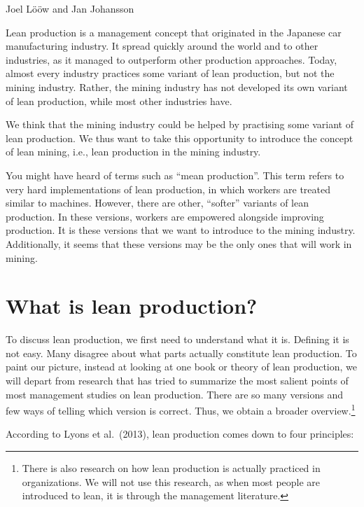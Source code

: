\documentclass[
  12pt,
]{scrbook}
\newenvironment{chap-auth}
{\vspace{1cm}\begin{center}\begin{flushright}\sffamily\noindent}
  {\end{flushright}\end{center}\vspace{1cm}}
\begin{document}
\begin{chap-auth}
Joel Lööw and Jan Johansson
\end{chap-auth}

Lean production is a management concept that originated in the Japanese car manufacturing industry. It spread quickly around the world and to other industries, as it managed to outperform other production approaches. Today, almost every industry practices some variant of lean production, but not the mining industry. Rather, the mining industry has not developed its own variant of lean production, while most other industries have.

We think that the mining industry could be helped by practising some variant of lean production. We thus want to take this opportunity to introduce the concept of lean mining, i.e., lean production in the mining industry.

You might have heard of terms such as ``mean production''. This term refers to very hard implementations of lean production, in which workers are treated similar to machines. However, there are other, ``softer'' variants of lean production. In these versions, workers are empowered alongside improving production. It is these versions that we want to introduce to the mining industry. Additionally, it seems that these versions may be the only ones that will work in mining.

\hypertarget{what-is-lean-production}{%
\section*{What is lean production?}\label{what-is-lean-production}}

To discuss lean production, we first need to understand what it is. Defining it is not easy. Many disagree about what parts actually constitute lean production. To paint our picture, instead at looking at one book or theory of lean production, we will depart from research that has tried to summarize the most salient points of most management studies on lean production. There are so many versions and few ways of telling which version is correct. Thus, we obtain a broader overview.\footnote{There is also research on how lean production is actually practiced in organizations. We will not use this research, as when most people are introduced to lean, it is through the management literature.}

According to Lyons et al.~(2013), lean production comes down to four principles:
\end{document}
